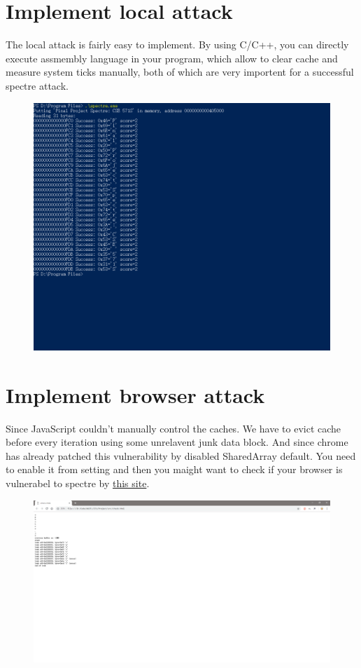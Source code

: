 \documentclass{article}
\begin{document}
\section{Implement local attack}
The local attack is fairly easy to implement. By using C/C++, you can directly execute assmembly language in your program, which allow to clear cache and measure system ticks manually, both of which are very importent for a successful spectre attack.
\begin{figure}[H]\centering\includegraphics[width=\textwidth]{01.png}\end{figure}
\section{Implement browser attack}
Since JavaScript couldn't manually control the caches. We have to evict cache before every iteration using some unrelavent junk data block. And since chrome has already patched this vulnerability by disabled SharedArray default. You need to enable it from setting and then you maight want to check if your browser is vulnerabel to spectre by \href{https://xlab.tencent.com/special/spectre/spectre_check.html}{this site}.
\begin{figure}[H]\centering\includegraphics[width=\textwidth]{02.png}\end{figure}
\end{document}
